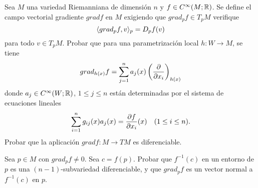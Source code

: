 \documentclass[twoside]{article}
\begin{document}
\begin{ejercicio}{9.14}
Sea $M$ una variedad Riemanniana de dimensión $n$ y $f\in C^{\infty}(M;\mathbb{R})$. Se define el campo vectorial gradiente $grad f$ en $M$ exigiendo que $grad_pf\in T_pM$ verifique
\[
\langle{grad_pf,v}\rangle_p=D_pf(v)
\]
para todo $v\in T_pM$. Probar que para una parametrización local $h:W\to M$, se tiene
\[
grad_{h(x)}f=\sum_{j=1}^n a_j(x)\left(\frac{\partial }{\partial x_i}\right)_{h(x)}
\]
donde $a_j\in C^{\infty}(W;\mathbb{R})$, $1\leq j\leq n$ están determinadas por el sistema de ecuaciones lineales 
\[
\sum_{i=1}^n g_{ij}(x)a_j(x)=\frac{\partial f}{\partial x_i}(x)\quad (1\leq i\leq n).
\]
Probar que la aplicación $grad f:M\to TM$ es diferenciable.

Sea $p\in M$ con $grad_p f\neq 0$. Sea $c=f(p)$. Probar que $f^{-1}(c)$ en un entorno de $p$ es una $(n-1)$-subvariedad diferenciable, y que $grad_pf$ es un vector normal a $f^{-1}(c)$ en $p$. 
\end{ejercicio}
\end{document}
